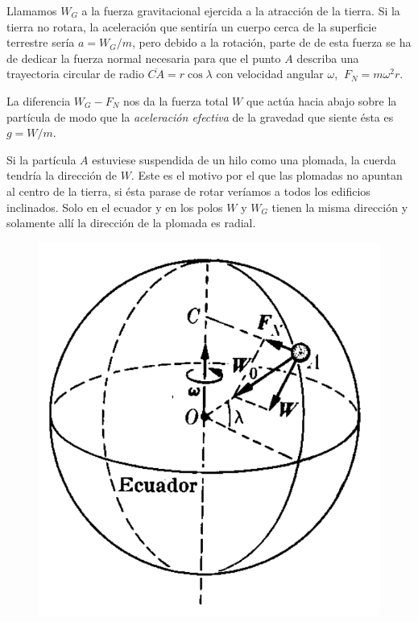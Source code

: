 Llamamos $W_G$ a la fuerza gravitacional ejercida a la atracción de la tierra. Si la tierra no rotara, la aceleración que sentiría un cuerpo cerca de la superficie terrestre sería $a=W_G/m$, pero debido a la rotación, parte de de esta fuerza se ha de dedicar la fuerza normal necesaria para que el punto $A$ describa una trayectoria circular de radio $\overline{CA}=r\cos \lambda$ con velocidad angular $\omega$, $\ F_N=m\omega^2 r$. 
\begin{multicols}{2}
La diferencia $W_G-F_N$ nos da la fuerza total $W$ que actúa hacia abajo sobre la partícula de modo que la \emph{aceleración efectiva} de la gravedad que siente ésta es $g=W/m$.

Si la partícula $A$ estuviese suspendida de un hilo como una plomada, la cuerda tendría la dirección de $W$. Este es el motivo por el que las plomadas no apuntan al centro de la tierra, si ésta parase de rotar veríamos a todos los edificios inclinados. Solo en el ecuador y en los polos $W$ y $W_G$ tienen la misma dirección y solamente allí la dirección de la plomada es radial.
\begin{figure}[H]
	\centering
	\includegraphics[width=.4\textwidth]{imagenes/imagenes03/T03IM58.png}
	\end{figure}
\end{multicols}


\vspace{30mm} %

